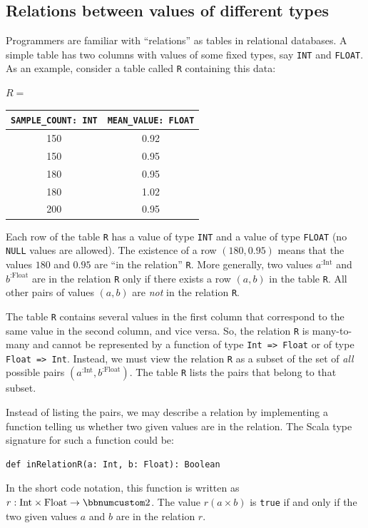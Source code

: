 \subsection{Relations between values of different types\label{subsec:Relations-between-types}}

Programmers are familiar with \textsf{``}relations\textsf{''} as tables in relational
databases. A simple table has two columns with values of some fixed
types, say \lstinline!INT! and \lstinline!FLOAT!. As an example,
consider a table called \lstinline!R! containing this data:
\begin{center}
$R=$ %
\begin{tabular}{|c|c|}
\hline 
\lstinline!SAMPLE_COUNT: INT! & \lstinline!MEAN_VALUE: FLOAT!\tabularnewline
\hline 
\hline 
{\footnotesize{}150} & {\footnotesize{}0.92}\tabularnewline
\hline 
{\footnotesize{}150} & {\footnotesize{}0.95}\tabularnewline
\hline 
{\footnotesize{}180} & {\footnotesize{}0.95}\tabularnewline
\hline 
{\footnotesize{}180} & {\footnotesize{}1.02}\tabularnewline
\hline 
{\footnotesize{}200} & {\footnotesize{}0.95}\tabularnewline
\hline 
\end{tabular}
\par\end{center}

Each row of the table \lstinline!R! has a value of type \lstinline!INT!
and a value of type \lstinline!FLOAT! (no \lstinline!NULL! values
are allowed). The existence of a row $\left(180,0.95\right)$ means
that the values $180$ and $0.95$ are \textsf{``}in the relation\textsf{''} \lstinline!R!.
More generally, two values $a^{:\text{Int}}$ and $b^{:\text{Float}}$
are in the relation \lstinline!R! only if there exists a row $\left(a,b\right)$
in the table \lstinline!R!. All other pairs of values $\left(a,b\right)$
are \emph{not} in the relation \lstinline!R!. 

The table \lstinline!R! contains several values in the first column
that correspond to the same value in the second column, and vice versa.
So, the relation \lstinline!R! is many-to-many and cannot be represented
by a function of type \lstinline!Int => Float! or of type \lstinline!Float => Int!.
Instead, we must view the relation \lstinline!R! as a subset of the
set of \emph{all} possible pairs $(a^{:\text{Int}},b^{:\text{Float}})$.
The table \lstinline!R! lists the pairs that belong to that subset.

Instead of listing the pairs, we may describe a relation by implementing
a function telling us whether two given values are in the relation.
The Scala type signature for such a function could be:
\begin{lstlisting}
def inRelationR(a: Int, b: Float): Boolean
\end{lstlisting}
In the short code notation, this function is written as $r:\text{Int}\times\text{Float}\rightarrow\bbnum 2$.
The value $r(a\times b)$ is \lstinline!true! if and only if the
two given values $a$ and $b$ are in the relation $r$.

